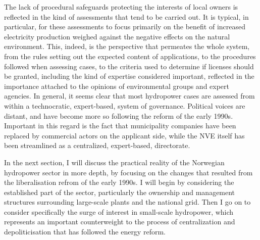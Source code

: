 The lack of procedural safeguards protecting the interests of local owners is reflected in the kind of assessments that tend to be carried out. It is typical, in particular, for these assessments to focus primarily on the benefit of increased electricity production weighed against the negative effects on the natural environment. This, indeed, is the perspective that permeates the whole system, from the rules setting out the expected content of applications, to the procedures followed when assessing cases, to the criteria used to determine if licenses should be granted, including the kind of expertise considered important, reflected in the importance attached to the opinions of environmental groups and expert agencies. In general, it seems clear that most hydropower cases are assessed from within a technocratic, expert-based, system of governance. Political voices are distant, and have become more so following the reform of the early 1990s. Important in this regard is the fact that municipality companies have been replaced by commercial actors on the applicant side, while the NVE itself has been streamlined as a centralized, expert-based, directorate.

In the next section, I will discuss the practical reality of the Norwegian hydropower sector in more depth, by focusing on the changes that resulted from the liberalisation refrom of the early 1990s. I will begin by considering the established part of the sector, particularly the ownership and management structures surrounding large-scale plants and the national grid. Then I go on to consider specifically the surge of interest in small-scale hydropower, which represents an important counterweight to the process of centralization and depoliticisation that has followed the energy reform.

%
%
%
%
%
%

